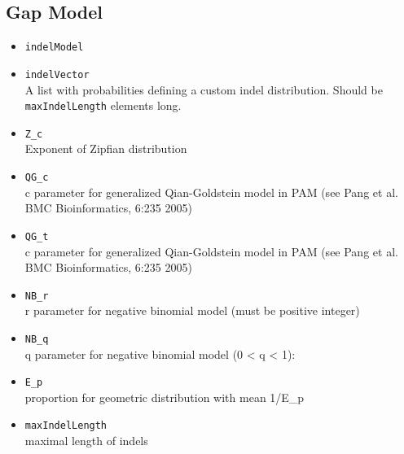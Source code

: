\documentclass[11pt]{article}
\begin{document}
\subsection{Gap Model}
\begin{itemize}
\item{\texttt{indelModel}} \hfill \\
\item{\texttt{indelVector}} \hfill \\
A list with probabilities defining a custom indel distribution. Should be \texttt{maxIndelLength} elements long.
\item{\texttt{Z\_c}} \hfill \\
Exponent of Zipfian distribution
\item{\texttt{QG\_c}} \hfill \\
c parameter for generalized Qian-Goldstein model in PAM (see Pang et al. BMC Bioinformatics, 6:235 2005)
\item{\texttt{QG\_t}} \hfill \\
c parameter for generalized Qian-Goldstein model in PAM (see Pang et al. BMC Bioinformatics, 6:235 2005)
\item{\texttt{NB\_r}} \hfill \\
r parameter for negative binomial model (must be positive integer)
\item{\texttt{NB\_q}} \hfill \\
q parameter for negative binomial model (0 < q < 1):
\item{\texttt{E\_p}} \hfill \\
proportion for geometric distribution with mean 1/E\_p
\item{\texttt{maxIndelLength}} \hfill \\
maximal length of indels


\end{itemize}
\end{document}
